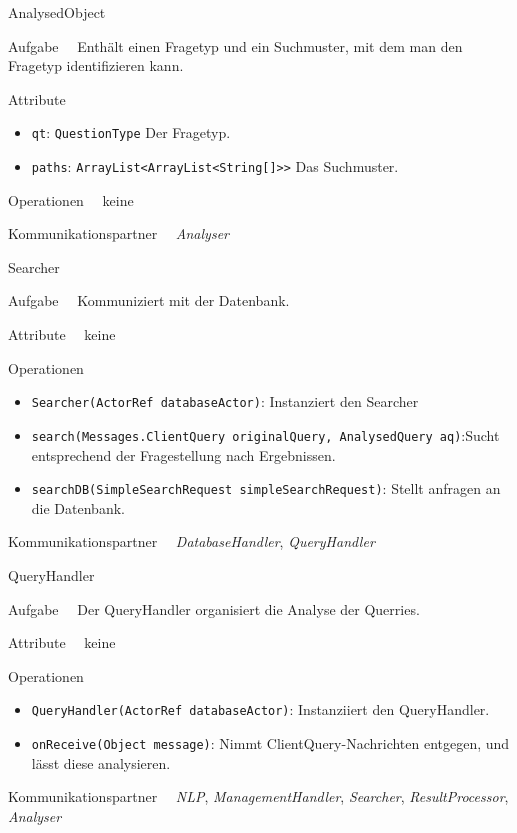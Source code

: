 \begin{class}{50}{AnalysedObject}
\item[Aufgabe]~\
Enthält einen Fragetyp und ein Suchmuster, mit dem man den Fragetyp
identifizieren kann.
\item[Attribute]~\
\begin{itemize}
\item \texttt{qt}: \texttt{QuestionType} Der Fragetyp.
\item \texttt{paths}: \texttt{ArrayList<ArrayList<String[]>>} Das Suchmuster.
\end{itemize}
\item[Operationen]~\
keine
\item[Kommunikationspartner]~\
\textit{Analyser}
\end{class}

\begin{class}{50}{Searcher}
\item[Aufgabe]~\
Kommuniziert mit der Datenbank.
\item[Attribute]~\
keine
\item[Operationen]~\
\begin{itemize}
\item \texttt{Searcher(ActorRef databaseActor)}: Instanziert den Searcher
\item \texttt{search(Messages.ClientQuery originalQuery, AnalysedQuery aq)}:Sucht entsprechend der Fragestellung nach Ergebnissen.
\item \texttt{searchDB(SimpleSearchRequest simpleSearchRequest)}: Stellt anfragen an die Datenbank.
\end{itemize}
\item[Kommunikationspartner]~\
\textit{DatabaseHandler}, \textit{QueryHandler}
\end{class}

\begin{class}{50}{QueryHandler}
\item[Aufgabe]~\
Der QueryHandler organisiert die Analyse der Querries.
\item[Attribute]~\
keine
\item[Operationen]~\
\begin{itemize}
	\item \texttt{QueryHandler(ActorRef databaseActor)}: Instanziiert den QueryHandler.
	\item \texttt{onReceive(Object message)}: Nimmt ClientQuery-Nachrichten entgegen, und lässt diese analysieren.
\end{itemize}
\item[Kommunikationspartner]~\
\textit{NLP}, \textit{ManagementHandler}, \textit{Searcher}, \textit{ResultProcessor}, \textit{Analyser}
\end{class}

